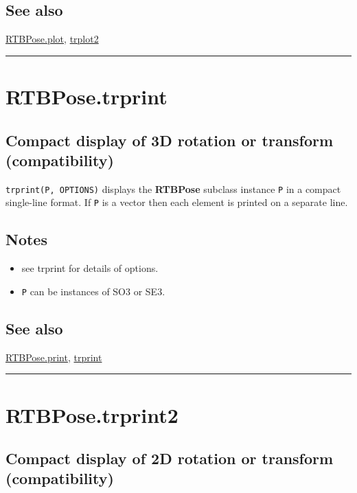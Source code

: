 \subsection*{See also}


\hyperlink{RTBPose.plot}{\color{blue} RTBPose.plot}, \hyperlink{trplot2}{\color{blue} trplot2}

\vspace{1.5ex}\hrule

\hypertarget{RTBPose.trprint}{\section*{RTBPose.trprint}}
\subsection*{Compact display of 3D rotation or transform (compatibility)}


\texttt{trprint(P, OPTIONS)} displays the \textbf{\color{red} RTBPose} subclass instance \texttt{P} in a
compact single-line format.  If \texttt{P} is a vector then each element is
printed on a separate line.


\subsection*{Notes}
\begin{itemize}
  \item see trprint for details of options.
  \item \texttt{P} can be instances of SO3 or SE3.
\end{itemize}

\subsection*{See also}


\hyperlink{RTBPose.print}{\color{blue} RTBPose.print}, \hyperlink{trprint}{\color{blue} trprint}

\vspace{1.5ex}\hrule

\hypertarget{RTBPose.trprint2}{\section*{RTBPose.trprint2}}
\subsection*{Compact display of 2D rotation or transform (compatibility)}


